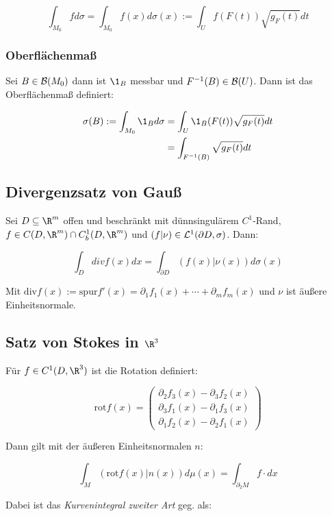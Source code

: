\vspace{-4mm}
$$\int_{M_0} f d\sigma = \int_{M_0} f(x) d\sigma(x) := \int_U f(F(t))\sqrt{g_F(t)} dt$$

\subsubsection*{Oberflächenmaß}

Sei $B \in \mathcal{B}(M_0)$ dann ist $\1_B$ messbar und $F^{-1}(B) \in \mathcal{B}(U)$. Dann ist das Oberflächenmaß definiert:

\vspace{-4mm}
\begin{align*}
\sigma(B) := \int_{M_0} \1_B d\sigma &= \int_U \1_B(F(t)) \sqrt{g_F(t)} dt\\
                             &= \int_{F^{-1}(B)} \sqrt{g_F(t)} dt
\end{align*}

\subsection*{Divergenzsatz von Gauß}

Sei $D \subseteq \R^m$ offen und beschränkt mit dünnsingulärem $C^1$-Rand, $f \in C(D,\R^m) \cap C_b^1(D,\R^m)$ und $(f|\nu) \in \mathcal{L}^1(\partial D,\sigma)$. Dann:

$$\int_D div f(x) dx = \int_{\partial D} (f(x)|\nu(x)) d\sigma(x)$$

Mit $\text{div} f(x) := \text{spur} f'(x) = \partial_1 f_1(x) + \cdots + \partial_m f_m(x)$ und $\nu$ ist äußere Einheitsnormale.

\subsection*{Satz von Stokes in $\R^3$}

Für $f \in C^1(D,\R^3)$ ist die Rotation definiert:

$$\text{rot} f(x) = \begin{pmatrix}
	\partial_2 f_3(x) - \partial_3 f_2(x) \\
	\partial_3 f_1(x) - \partial_1 f_3(x) \\
	\partial_1 f_2(x) - \partial_2 f_1(x)
\end{pmatrix}$$

Dann gilt mit der äußeren Einheitsnormalen $n$:

$$\int_M (\text{rot} f(x) | n(x)) d\mu(x) = \int_{\partial_2 M} f \cdot dx$$

Dabei ist das \emph{Kurvenintegral zweiter Art} geg. als:

